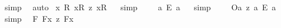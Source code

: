 \begin{isabellebody}
\ simp\ \isamarkupfalse%
\ auto%
\endisatagproof
{\isafoldproof}%
%
\isadelimproof
%
\endisadelimproof
\isanewline
{}\isamarkupfalse%
\ {\isachardoublequoteopen}{\isacharbrackleft}{\isasymforall}{\isacharparenleft}{\isasymlambda}x{\isachardot}\ {\isasymforall}{\isacharparenleft}{\isasymlambda}R{\isachardot}\ {\isacharparenleft}{\isacharless}{\isachardot}x{\isachardot}{\isasymcirc}{\isachardot}R{\isachardot}{\isachargreater}\ {\isasymrightarrow}\isactrlsup z\ {\isacharless}{\isachardot}x{\isachardot}{\isasymcirc}R{}{\isachargreater}{\isacharparenright}{\isacharparenright}{\isacharparenright}{\isacharbrackright}{\isachardoublequoteclose}%
\isadelimproof
\ %
\endisadelimproof
%
\isatagproof
{}\isamarkupfalse%
\ simp%
\endisatagproof
{\isafoldproof}%
%
\isadelimproof
%
\endisadelimproof
\ \isamarkupfalse%
%
\isadelimproof
\ %
\endisadelimproof
%
\isatagproof
{}\isamarkupfalse%
%
\endisatagproof
{\isafoldproof}%
%
\isadelimproof
%
\endisadelimproof
\isanewline
\isanewline
{}\isamarkupfalse%
\ {\isachardoublequoteopen}{\isacharbrackleft}a\ {\isacharequal}\isactrlsub E\ a{\isacharbrackright}{\isachardoublequoteclose}%
\isadelimproof
\ %
\endisadelimproof
%
\isatagproof
{}\isamarkupfalse%
\ simp%
\endisatagproof
{\isafoldproof}%
%
\isadelimproof
%
\endisadelimproof
\ \isamarkupfalse%
%
\isadelimproof
\ %
\endisadelimproof
%
\isatagproof
{}\isamarkupfalse%
%
\endisatagproof
{\isafoldproof}%
%
\isadelimproof
%
\endisadelimproof
\isanewline
\isanewline
{}\isamarkupfalse%
\ {\isachardoublequoteopen}{\isacharbrackleft}{\isacharless}O\isactrlsup {\isacharbang}{\isasymbullet}a{\isachargreater}\ {\isasymrightarrow}\isactrlsup z\ a\ {\isacharequal}\isactrlsub E\ a{\isacharbrackright}{\isachardoublequoteclose}%
\isadelimproof
\ %
\endisadelimproof
%
\isatagproof
{}\isamarkupfalse%
\ simp\ \isamarkupfalse%
%
\endisatagproof
{\isafoldproof}%
%
\isadelimproof
%
\endisadelimproof
\isanewline
\isanewline
{}\isamarkupfalse%
\ {\isachardoublequoteopen}{\isacharbrackleft}{\isacharparenleft}{\isasymforall}{\isacharparenleft}{\isasymlambda}F{\isachardot}\ {\isacharless}{\isachardot}F{\isachardot}{\isasymbullet}{\isachardot}x{\isachardot}{\isachargreater}\ {\isasymequiv}\isactrlsup z\ {\isacharless}{\isachardot}F{\isachardot}{\isasymbullet}{\isachardot}x{\isachardot}{\isachargreater}{\isacharparenright}{\isacharparenright}{\isacharbrackright}{\isachardoublequoteclose}%

\end{isabellebody}
